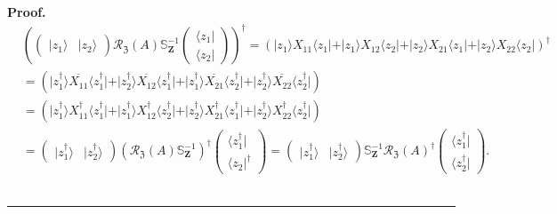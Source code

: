\documentclass[aps, preprint]{revtex4}
\newenvironment{proof}[1][Proof]{\noindent\textbf{#1.} }{\ \rule{0.5em}{0.5em}}
\begin{document}
\begin{proof}
\begin{align} & \left (\left (\begin{array}{cc}\vert z_{1} \rangle  & \vert z_{2} \rangle \end{array}\right ) \mathcal{R}_{\mathfrak{Z}} \left (A\right ) \mathbb{S}_{\mathbf{Z}}^{ -1} \left (\begin{array}{c} \langle z_{1}\vert  \\
 \langle z_{2}\vert \end{array}\right )\right )^{ \dag } =\left (\vert z_{1} \rangle X_{1 1}  \langle z_{1}\vert  +\vert z_{1} \rangle  X_{1 2}  \langle z_{2}\vert  +\vert z_{2} \rangle  X_{2 1}  \langle z_{1}\vert  +\vert z_{2} \rangle  X_{2 2} \langle z_{2}\vert \right )^{ \dag } \\
 &  =\left (\vert z_{1}^{ \dag } \rangle \overline{X_{1 1}}  \langle z_{1}^{ \dag }\vert  +\vert z_{2}^{ \dag } \rangle  \overline{X_{1 2}}  \langle z_{1}^{ \dag }\vert  +\vert z_{1}^{ \dag } \rangle  \overline{X_{2 1}}  \langle z_{2}^{ \dag }\vert  +\vert z_{2}^{ \dag } \rangle  \overline{X_{2 2}} \langle z_{2}^{ \dag }\vert \right ) \\
 &  =\left (\vert z_{1}^{ \dag } \rangle X_{1 1}^{ \dag }  \langle z_{1}^{ \dag }\vert  +\vert z_{1}^{ \dag } \rangle  X_{1 2}^{ \dag }  \langle z_{2}^{ \dag }\vert  +\vert z_{2}^{ \dag } \rangle  X_{2 1}^{ \dag }  \langle z_{1}^{ \dag }\vert  +\vert z_{2}^{ \dag } \rangle  X_{2 2}^{ \dag } \langle z_{2}^{ \dag }\vert \right ) \\
 &  =\left (\begin{array}{cc}\vert z_{1}^{ \dag } \rangle  & \vert z_{2}^{ \dag } \rangle \end{array}\right ) \left (\mathcal{R}_{\mathfrak{Z}} \left (A\right ) \mathbb{S}_{\mathbf{Z}}^{ -1}\right )^{ \dag } \left (\begin{array}{c} \langle z_{1}^{ \dag }\vert  \\
 \langle z_{2}\vert ^{ \dag }\end{array}\right ) =\left (\begin{array}{cc}\vert z_{1}^{ \dag } \rangle  & \vert z_{2}^{ \dag } \rangle \end{array}\right ) \mathbb{S}_{\mathbf{Z}}^{ -1} \mathcal{R}_{\mathfrak{Z}} \left (A\right )^{ \dag } \left (\begin{array}{c} \langle z_{1}^{ \dag }\vert  \\
 \langle z_{2}^{ \dag }\vert \end{array}\right )\text{.}\end{align}
\end{proof}
\end{document}
